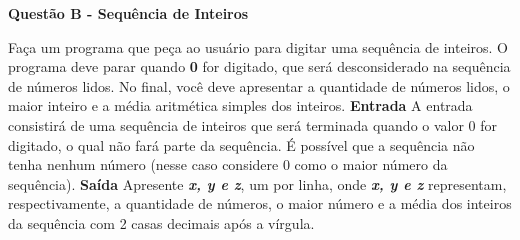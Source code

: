 \documentclass[a4paper, 12pt]{article}
\begin{document}
\newpage %
\begin{center}
\textbf{{\Large Questão B - Sequência de Inteiros}}
\end{center}
\vspace{5pt}
Faça um programa que peça ao usuário para digitar uma sequência de inteiros. O programa deve parar quando \textbf{0} for digitado, que será desconsiderado na sequência de números lidos. No final, você deve apresentar a quantidade de números lidos, o maior inteiro e a média aritmética simples dos inteiros.
\newline \newline
\textbf{{\large Entrada}} \newline
A entrada consistirá de uma sequência de inteiros que será terminada quando o valor 0 for digitado, o qual não fará parte da sequência. É possível que a sequência não tenha nenhum número (nesse caso considere 0 como o maior número da sequência).
\newline \newline
\textbf{{\large Saída}} \newline
Apresente \textbf{\textit{x, y e z}}, um por linha, onde \textbf{\textit{x, y e z}} representam, respectivamente, a quantidade de números, o maior número e a média dos inteiros da sequência com 2 casas decimais após a vírgula.
\newline
\end{document}
